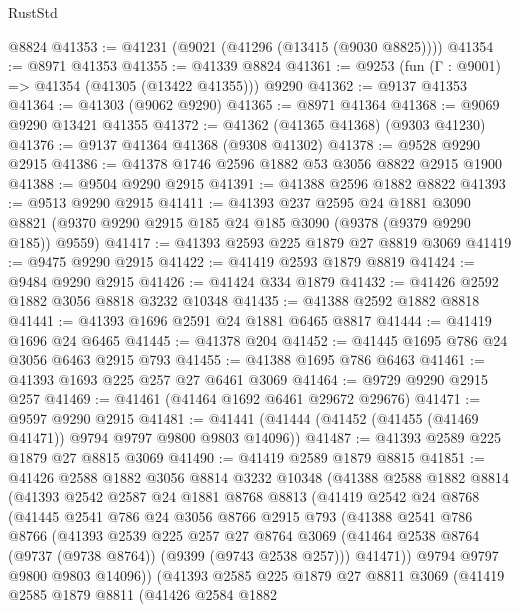 \begin{lexlean}{RustStd}
\begin{coremodule}
    @8824
@41353 := @41231 (@9021 (@41296 (@13415 (@9030 @8825))))
@41354 := @8971 @41353
@41355 := @41339 @8824
@41361 := @9253 (fun (Γ : @9001) => @41354 (@41305 (@13422 @41355))) @9290
@41362 := @9137 @41353
@41364 := @41303 (@9062 @9290)
@41365 := @8971 @41364
@41368 := @9069 @9290 @13421 @41355
@41372 := @41362 (@41365 @41368) (@9303 @41230)
@41376 := @9137 @41364 @41368 (@9308 @41302)
@41378 := @9528 @9290 @2915
@41386 := @41378 @1746 @2596 @1882 @53 @3056 @8822 @2915 @1900
@41388 := @9504 @9290 @2915
@41391 := @41388 @2596 @1882 @8822
@41393 := @9513 @9290 @2915
@41411 := @41393
    @237
    @2595
    @24
    @1881
    @3090
    @8821
    (@9370 @9290 @2915 @185 @24 @185 @3090 (@9378 (@9379 @9290 @185)) @9559)
@41417 := @41393 @2593 @225 @1879 @27 @8819 @3069
@41419 := @9475 @9290 @2915
@41422 := @41419 @2593 @1879 @8819
@41424 := @9484 @9290 @2915
@41426 := @41424 @334 @1879
@41432 := @41426 @2592 @1882 @3056 @8818 @3232 @10348
@41435 := @41388 @2592 @1882 @8818
@41441 := @41393 @1696 @2591 @24 @1881 @6465 @8817
@41444 := @41419 @1696 @24 @6465
@41445 := @41378 @204
@41452 := @41445 @1695 @786 @24 @3056 @6463 @2915 @793
@41455 := @41388 @1695 @786 @6463
@41461 := @41393 @1693 @225 @257 @27 @6461 @3069
@41464 := @9729 @9290 @2915 @257
@41469 := @41461 (@41464 @1692 @6461 @29672 @29676)
@41471 := @9597 @9290 @2915
@41481 := @41441 (@41444 (@41452 (@41455 (@41469 @41471)) @9794 @9797 @9800 @9803 @14096))
@41487 := @41393 @2589 @225 @1879 @27 @8815 @3069
@41490 := @41419 @2589 @1879 @8815
@41851 := @41426
    @2588
    @1882
    @3056
    @8814
    @3232
    @10348
    (@41388
      @2588
      @1882
      @8814
      (@41393
        @2542
        @2587
        @24
        @1881
        @8768
        @8813
        (@41419
          @2542
          @24
          @8768
          (@41445
            @2541
            @786
            @24
            @3056
            @8766
            @2915
            @793
            (@41388
              @2541
              @786
              @8766
              (@41393
                @2539
                @225
                @257
                @27
                @8764
                @3069
                (@41464 @2538 @8764 (@9737 (@9738 @8764)) (@9399 (@9743 @2538 @257)))
                @41471))
            @9794
            @9797
            @9800
            @9803
            @14096))
        (@41393
          @2585
          @225
          @1879
          @27
          @8811
          @3069
          (@41419
            @2585
            @1879
            @8811
            (@41426
              @2584
              @1882

\end{coremodule}
\end{lexlean}
